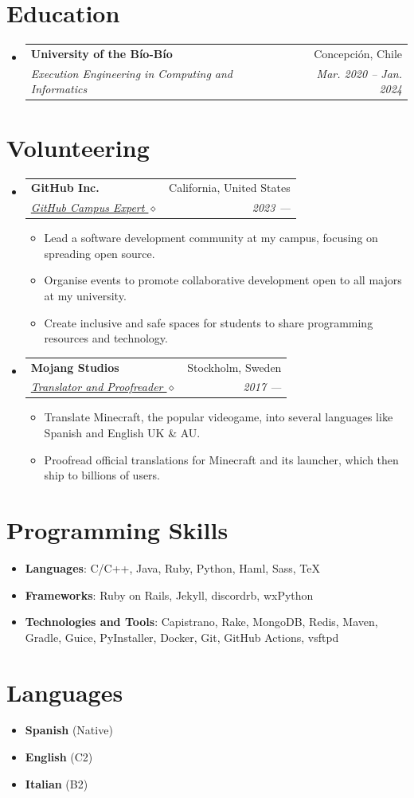 \documentclass[letterpaper,11pt]{article}
\makeatletter
\newcommand{\resumeSubheading}[4]{
  \vspace{-1pt}\item
    \begin{tabular*}{0.97\textwidth}[t]{l@{\extracolsep{\fill}}r}
      \textbf{#1} & #2 \\
      \textit{\small#3} & \textit{\small #4} \\
    \end{tabular*}\vspace{-5pt}
}
\newcommand{\resumeSubHeadingListStart}{\begin{itemize}[leftmargin=*]}
\newcommand{\resumeSubHeadingListEnd}{\end{itemize}}
\newcommand{\resumeItemListStart}{\begin{itemize}}
\newcommand{\resumeItemListEnd}{\end{itemize}\vspace{-5pt}}
\makeatother
\begin{document}
  \section{Education}
  \resumeSubHeadingListStart
    \resumeSubheading
      {University of the Bío-Bío}{Concepción, Chile}
      {Execution Engineering in Computing and Informatics}{Mar. 2020 -- Jan. 2024}
  \resumeSubHeadingListEnd
  
\section{Volunteering}
  \resumeSubHeadingListStart
    \resumeSubheading
    {GitHub Inc.}{California, United States}
    {\href{https://githubcampus.expert/BGMP}{GitHub Campus Expert $\diamond$}}{2023 ---}
    \resumeItemListStart
      \item{Lead a software development community at my campus, focusing on spreading open source.}
      \item{Organise events to promote collaborative development open to all majors at my university.}
      \item{Create inclusive and safe spaces for students to share programming resources and technology.}
    \resumeItemListEnd
    \resumeSubheading
    {Mojang Studios}{Stockholm, Sweden}
    {\href{https://crowdin.com/profile/bgm}{Translator and Proofreader $\diamond$}}{2017 ---}
    \resumeItemListStart
      \item{Translate Minecraft, the popular videogame, into several languages like Spanish and English UK \& AU.}
      \item{Proofread official translations for Minecraft and its launcher, which then ship to billions of users.}
    \resumeItemListEnd
    \resumeSubHeadingListEnd

\section{Programming Skills}
  \resumeSubHeadingListStart
    \item{
      \textbf{Languages}{: C/C++, Java, Ruby, Python, Haml, Sass, TeX}
    }
    \item{
      \textbf{Frameworks}{: Ruby on Rails, Jekyll, discordrb, wxPython}
    }
    \item{
      \textbf{Technologies and Tools}{: Capistrano, Rake, MongoDB, Redis, Maven, Gradle, Guice, PyInstaller, Docker, Git, GitHub Actions, vsftpd}
    }
  \resumeSubHeadingListEnd

\section{Languages}
\resumeSubHeadingListStart
\item{
  \textbf{Spanish}{ (Native)}
}
\item{
  \textbf{English}{ (C2)}
}
\item{
  \textbf{Italian}{ (B2)}
}
\resumeSubHeadingListEnd

\end{document}
